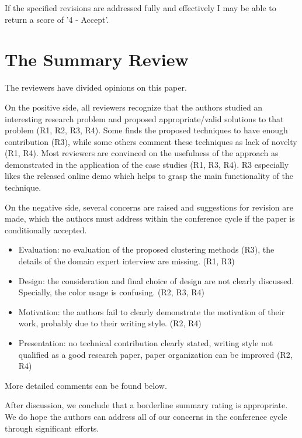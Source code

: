 \documentclass{article}
\begin{document}
    If the specified revisions are addressed fully and effectively I may be able
    to return a score of '4 - Accept'.

\section{The Summary Review}
    The reviewers have divided opinions on this paper.

    On the positive side, all reviewers recognize that the authors studied an
    interesting research problem and proposed appropriate/valid solutions to
    that problem (R1, R2, R3, R4). Some finds the proposed techniques to have
    enough contribution (R3), while some others comment these techniques as lack
    of novelty (R1, R4). Most reviewers are convinced on the usefulness of the
    approach as demonstrated in the application of the case studies (R1, R3,
    R4). R3 especially likes the released online demo which helps to grasp the
    main functionality of the technique.

    On the negative side, several concerns are raised and suggestions for
    revision are made, which the authors must address within the conference
    cycle if the paper is conditionally accepted.

    \begin{itemize}
    \item{Evaluation: no evaluation of the proposed clustering methods (R3), the details
    of the domain expert interview are missing. (R1, R3)}

    \item{Design: the consideration and final choice of design are not clearly discussed.
    Specially, the color usage is confusing. (R2, R3, R4)}

    \item{Motivation: the authors fail to clearly demonstrate the motivation of their
    work, probably due to their writing style. (R2, R4)}

    \item{Presentation: no technical contribution clearly stated, writing style not
    qualified as a good research paper, paper organization can be improved (R2, R4)}
    \end{itemize}

    More detailed comments can be found below.

    After discussion, we conclude that a borderline summary rating is appropriate. We
    do hope the authors can address all of our concerns in the conference cycle
    through significant efforts.
\end{document}
